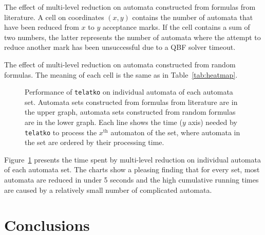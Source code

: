 \documentclass[a4paper,UKenglish,cleveref,autoref,thm-restate]{lipics-v2021}
\newcommand{\telatko}{\texttt{telatko}\xspace}
\begin{document}
\begin{table}[t]
  \caption{The effect of multi-level reduction on automata constructed
    from formulas from literature.  A cell on coordinates $(x,y)$
    contains the number of automata that have been reduced from $x$ to
    $y$ acceptance marks. If the cell contains a sum of two numbers,
    the latter represents the number of automata where the attempt to
    reduce another mark has been unsuccessful due to a QBF solver
    timeout.}
\label{tab:heatmap}
\setlength{\tabcolsep}{2.5pt}
\centering

\end{table}

\begin{table}[t]
\caption{The effect of multi-level reduction on automata constructed
    from random formulas. The meaning of each cell is the same as in Table~\ref{tab:heatmap}.}
\label{tab:heatmap-random}
\setlength{\tabcolsep}{2.5pt}
\centering

\end{table}

\begin{figure}[p]
  \centering
  
  \bigskip\bigskip
  
  \bigskip
  \caption{Performance of \telatko on individual automata of each automata set.
    Automata sets constructed from formulas from literature are in the upper graph,
    automata sets constructed from random formulas are in the lower graph.
    Each line shows the time ($y$ axis) needed by \telatko to process the
    $x^\textrm{th}$ automaton of the set, where automata in the set are ordered by
    their processing time.
  }
\label{fig:quantile}\end{figure}

Figure~\ref{fig:quantile} presents the time spent by multi-level
reduction on individual automata of each automata set. The charts
show a pleasing finding that for every set, most automata are reduced
in under 5 seconds and the high cumulative running times are caused by 
a relatively small number of complicated automata.


\section{Conclusions}\label{sec:conclusion}
\end{document}
